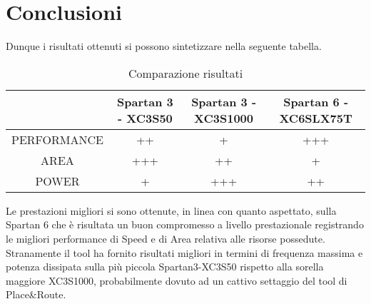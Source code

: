 \section{Conclusioni}
Dunque i risultati ottenuti si possono sintetizzare nella seguente tabella.
\begin{table}[H]
	\centering
	\fontsize{10}{18}\selectfont
	\begin{tabular}{|p{30mm}|p{30mm}|p{30mm}|p{30mm}|}
		\hline
		\multicolumn{1}{|c|}{} &
		\multicolumn{1}{c|}{\textbf{Spartan 3 - XC3S50}} & 
		\multicolumn{1}{c|}{\textbf{Spartan 3 - XC3S1000}} & 
		\multicolumn{1}{c|}{\textbf{Spartan 6 - XC6SLX75T}} \\
		
		\hline
		\multicolumn{1}{|c|}{PERFORMANCE} &
		\multicolumn{1}{c|}{++} & 
		\multicolumn{1}{c|}{+} & 
		\multicolumn{1}{c|}{+++} \\
		
		\hline
		\multicolumn{1}{|c|}{AREA} &
		\multicolumn{1}{c|}{+++} & 
		\multicolumn{1}{c|}{++} & 
		\multicolumn{1}{c|}{+} \\
		
		\hline
		\multicolumn{1}{|c|}{POWER} &
		\multicolumn{1}{c|}{+} & 
		\multicolumn{1}{c|}{+++} & 
		\multicolumn{1}{c|}{++} \\ \hline
		
	\end{tabular}
	\caption{Comparazione risultati}
\end{table}
\noindent
Le prestazioni migliori si sono ottenute, in linea con quanto aspettato, sulla Spartan 6 che è risultata un buon compromesso a livello prestazionale registrando le migliori performance di Speed e di Area relativa alle risorse possedute.\\
Stranamente il tool ha fornito risultati migliori in termini di frequenza massima e potenza dissipata sulla più piccola Spartan3-XC3S50 rispetto alla sorella maggiore XC3S1000, probabilmente dovuto ad un cattivo settaggio del tool di Place\&Route.


